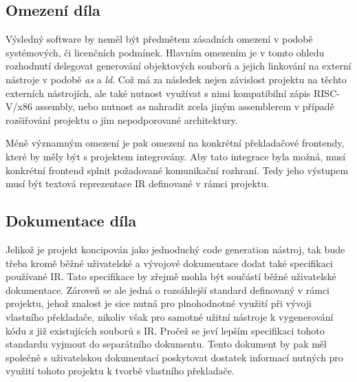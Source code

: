\documentclass{article}
\def\xxx#1{\textcolor{red!50}{\itshape #1}}
\begin{document}
\subsection{Omezení díla}

Výsledný software by neměl být předmětem zásadních omezení v podobě systémových, či licenčních podmínek. Hlavním omezením je v tomto ohledu rozhodnutí delegovat generování objektových souborů a jejich linkování na externí nástroje v podobě \textit{as} a \textit{ld}. Což má za následek nejen závislost projektu na těchto externích nástrojích, ale také nutnost využívat s nimi kompatibilní zápis RISC-V/x86 assembly, nebo nutnost \textit{as} nahradit zcela jiným assemblerem v případě rozšiřování projektu o jím nepodporované architektury.

Méně významným omezení je pak omezení na konkrétní překladačové frontendy, které by měly být s projektem integrovány. Aby tato integrace byla možná, musí konkrétní frontend splnit požadované komunikační rozhraní. Tedy jeho výstupem musí být textová reprezentace IR definované v rámci projektu.


\subsection{Dokumentace díla}

Jelikož je projekt koncipován jako jednoduchý code generation nástroj, tak bude třeba kromě běžné uživatelské a vývojové dokumentace dodat také specifikaci používané IR. Tato specifikace by zřejmě mohla být součástí běžné uživatelské dokumentace. Zároveň se ale jedná o rozsáhlejší standard definovaný v rámci projektu, jehož znalost je sice nutná pro plnohodnotné využití při vývoji vlastního překladače, nikoliv však pro samotné užitní nástroje k vygenerování kódu z již existujících souborů s IR. Pročež se jeví lepším specifikaci tohoto standardu vyjmout do separátního dokumentu. Tento dokument by pak měl společně s uživatelskou dokumentací poskytovat dostatek informací nutných pro využití tohoto projektu k tvorbě vlastního překladače.
\end{document}
